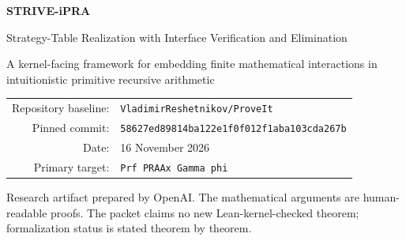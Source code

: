 \documentclass[11pt,oneside]{article}
\theoremstyle{definition}
\theoremstyle{remark}
\newcommand{\code}[1]{\texttt{#1}}
\begin{document}

\begin{titlepage}
\centering
\vspace*{1.2cm}
{\Huge\bfseries STRIVE-iPRA\par}
\vspace{0.35cm}
{\LARGE Strategy-Table Realization with Interface Verification and Elimination\par}
\vspace{0.9cm}
{\large A kernel-facing framework for embedding finite mathematical interactions in intuitionistic primitive recursive arithmetic\par}
\vfill
\begin{tabular}{rl}
Repository baseline: & \code{VladimirReshetnikov/ProveIt} \\
Pinned commit: & \code{58627ed89814ba122e1f0f012f1aba103cda267b} \\
Date: & 16 November 2026 \\
Primary target: & \code{Prf PRAAx Gamma phi}
\end{tabular}
\vfill
{\small Research artifact prepared by OpenAI.  The mathematical arguments are
human-readable proofs.  The packet claims no new Lean-kernel-checked theorem;
formalization status is stated theorem by theorem.\par}
\end{titlepage}


\tableofcontents
\clearpage
{}














\appendix




\end{document}
